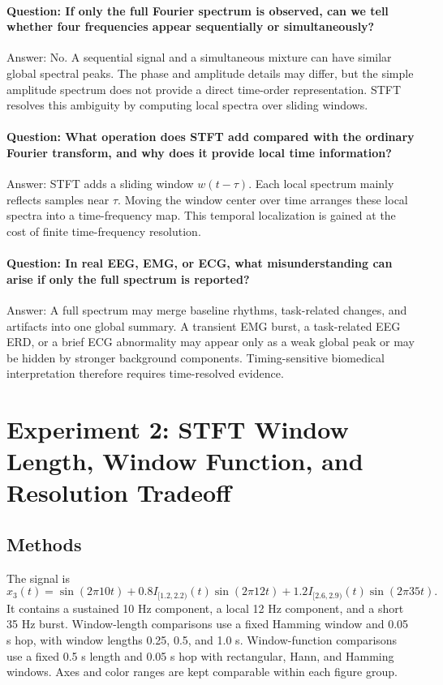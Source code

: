 \documentclass[a4paper,11pt]{article}
\numberwithin{equation}{section}
\begin{document}
\paragraph{Question: If only the full Fourier spectrum is observed, can we tell whether four frequencies appear sequentially or simultaneously?}
Answer: No. A sequential signal and a simultaneous mixture can have similar global spectral peaks. The phase and amplitude details may differ, but the simple amplitude spectrum does not provide a direct time-order representation. STFT resolves this ambiguity by computing local spectra over sliding windows.

\paragraph{Question: What operation does STFT add compared with the ordinary Fourier transform, and why does it provide local time information?}
Answer: STFT adds a sliding window $w(t-\tau)$. Each local spectrum mainly reflects samples near $\tau$. Moving the window center over time arranges these local spectra into a time-frequency map. This temporal localization is gained at the cost of finite time-frequency resolution.

\paragraph{Question: In real EEG, EMG, or ECG, what misunderstanding can arise if only the full spectrum is reported?}
Answer: A full spectrum may merge baseline rhythms, task-related changes, and artifacts into one global summary. A transient EMG burst, a task-related EEG ERD, or a brief ECG abnormality may appear only as a weak global peak or may be hidden by stronger background components. Timing-sensitive biomedical interpretation therefore requires time-resolved evidence.

\FloatBarrier
\clearpage
\section{Experiment 2: STFT Window Length, Window Function, and Resolution Tradeoff}
\subsection{Methods}
The signal is
\begin{equation}
x_3(t)=\sin(2\pi 10t)+0.8I_{[1.2,2.2)}(t)\sin(2\pi 12t)+1.2I_{[2.6,2.9)}(t)\sin(2\pi 35t).
\end{equation}
It contains a sustained 10 Hz component, a local 12 Hz component, and a short 35 Hz burst. Window-length comparisons use a fixed Hamming window and 0.05 s hop, with window lengths 0.25, 0.5, and 1.0 s. Window-function comparisons use a fixed 0.5 s length and 0.05 s hop with rectangular, Hann, and Hamming windows. Axes and color ranges are kept comparable within each figure group.
\end{document}

